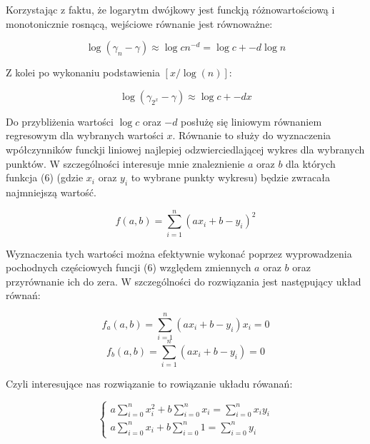 \documentclass[11pt,wide]{mwart}
\begin{document}
Korzystając z faktu, że logarytm dwójkowy jest funckją różnowartościową i monotonicznie rosnącą, wejściowe równanie jest równoważne:

\begin{equation}
\log(\gamma_{n} - \gamma) \approx \log{cn^{-d}} = \log{c} + -d\log{n}
\end{equation}

Z kolei po wykonaniu podstawienia $[x/\log(n)]$:

\begin{equation}
\log(\gamma_{2^{x}} - \gamma) \approx \log{c} + -dx
\end{equation}

Do przybliżenia wartości $\log{c}$ oraz $-d$ posłużę się liniowym równaniem regresowym dla wybranych wartości $x$.
Równanie to służy do wyznaczenia wpółczynników funckji liniowej najlepiej odzwierciedlającej wykres dla wybranych punktów.
W szczególności interesuje mnie znaleznienie $a$ oraz $b$ dla których funkcja (6) (gdzie $x_i$ oraz $y_i$ to wybrane punkty wykresu) będzie zwracała najmniejszą wartość.

\begin{equation}
f(a, b) = \sum_{i = 1}^{n} ( ax_i + b - y_i)^2
\end{equation}

Wyznaczenia tych wartości można efektywnie wykonać poprzez wyprowadzenia pochodnych częściowych funcji (6) względem zmiennych $a$ oraz $b$ oraz przyrównanie ich do zera.
W szczególności do rozwiązania jest następujący układ równań:

\begin{equation}
f_a(a, b) = \sum_{i = 1}^{n} ( ax_i + b - y_i)x_i = 0
\end{equation}
\begin{equation}
f_b(a, b) = \sum_{i = 1}^{n} ( ax_i + b - y_i) = 0
\end{equation}


Czyli interesujące nas rozwiązanie to rowiązanie układu rówanań:

\begin{equation}
\begin{cases}

a\sum_{i = 0}^n x_i^2 + b\sum_{i=0}^n x_i = \sum_{i = 0}^n x_i y_i \\
a\sum_{i = 0}^n x_i + b\sum_{i = 0}^n 1 = \sum_{i = 0} ^n y_i

\end{cases}
\end{equation}
\end{document}
